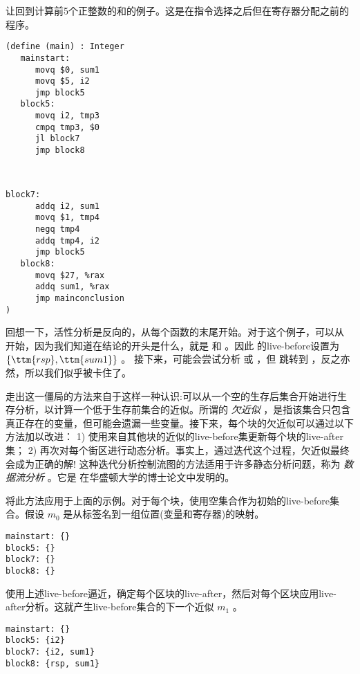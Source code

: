 \documentclass[11pt]{book}
\begin{document}
让回到计算前5个正整数的和的例子。这是在指令选择之后但在寄存器分配之前的程序。
\begin{center}
\begin{minipage}{0.45\textwidth}
\begin{lstlisting}
(define (main) : Integer
   mainstart:
      movq $0, sum1
      movq $5, i2
      jmp block5
   block5:
      movq i2, tmp3
      cmpq tmp3, $0
      jl block7
      jmp block8
\end{lstlisting}
\end{minipage}
\begin{minipage}{0.45\textwidth}
  \begin{lstlisting}

    
block7:
      addq i2, sum1
      movq $1, tmp4
      negq tmp4
      addq tmp4, i2
      jmp block5
   block8:
      movq $27, %rax
      addq sum1, %rax
      jmp mainconclusion
)
\end{lstlisting}
  \end{minipage}
\end{center}
回想一下，活性分析是反向的，从每个函数的末尾开始。对于这个例子，可以从 
开始，因为我们知道在结论的开头是什么，就是  和  。因此  的live-before设置为 $\{\ttm{rsp},\ttm{sum1}\}$ 。
%
接下来，可能会尝试分析  或  ，但
 跳转到  ，反之亦然，所以我们似乎被卡住了。

走出这一僵局的方法来自于这样一种认识:可以从一个空的生存后集合开始进行生存分析，以计算一个低于生存前集合的近似。所谓的
\emph{欠近似} ，是指该集合只包含真正存在的变量，但可能会遗漏一些变量。接下来，每个块的欠近似可以通过以下方法加以改进： 1) 使用来自其他块的近似的live-before集更新每个块的live-after集； 2) 再次对每个街区进行动态分析。事实上，通过迭代这个过程，欠近似最终会成为正确的解!
%
这种迭代分析控制流图的方法适用于许多静态分析问题，称为
\emph{数据流分析} 。它是
\citet{Kildall:1973vn} 在华盛顿大学的博士论文中发明的。

将此方法应用于上面的示例。对于每个块，使用空集合作为初始的live-before集合。假设 $m_0$ 是从标签名到一组位置(变量和寄存器)的映射。
\begin{center}
\begin{lstlisting}
mainstart: {}
block5: {}
block7: {}
block8: {}
\end{lstlisting}
\end{center}
使用上述live-before逼近，确定每个区块的live-after，然后对每个区块应用live-after分析。这就产生live-before集合的下一个近似 $m_1$ 。
\begin{center}
  \begin{lstlisting}
mainstart: {}
block5: {i2}
block7: {i2, sum1}
block8: {rsp, sum1}
\end{lstlisting}
\end{center}
\end{document}
